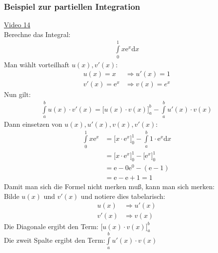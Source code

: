 \subsubsection{Beispiel zur partiellen Integration }
\href{https://youtu.be/92SY1mE5hrMvv}{Video 14}\\
Berechne das Integral:\\
\begin{align*}
\int\limits_{0}^{1} x \mathrm{e}^x\mathrm{d}x
\end{align*}
Man wählt vorteilhaft $ u(x), v'(x) $:\\
\begin{align*}
u(x)=x&\Rightarrow u'(x)=1\\
v'(x)=\mathrm{e}^x&\Rightarrow v(x)=e^x
\end{align*}
Nun gilt:\\
\begin{align*}
\int\limits_{a}^{b}u(x)\cdot v'(x) =\big[u(x)\cdot v(x)\big]^b_a-\int\limits_{a}^{b}u'(x)\cdot v(x) 
\end{align*}
Dann einsetzen von $ u(x), u'(x), v(x), v'(x) $:\\
\begin{align*}
\int\limits_{0}^{1} x\mathrm{e}^x&=\bigg[x\cdot \mathrm{e}^x\bigg]^1_0-\int\limits_{a}^{b} 1\cdot\mathrm{e}^x \mathrm{d}x\\
&=\bigg[x\cdot \mathrm{e}^x\bigg]^1_0-\bigg[\mathrm{e}^x\bigg]_0^1\\
&=\mathrm{e}-0\mathrm{e}^0-(\mathrm{e}-1)\\
&=\mathrm{e}-\mathrm{e}+1=1
\end{align*}
Damit man sich die Formel nicht merken muß, kann man sich merken:\\
Bilde $ u(x) $ und $ v'(x) $ und notiere dies tabelarisch:\\
\begin{align*}
u(x)&\Rightarrow u'(x)\\
v'(x)&\Rightarrow v(x)
\end{align*}
Die Diagonale ergibt den Term: $\big[u(x)\cdot v(x)\big]^b_a  $\\
Die zweit Spalte ergibt den Term:$ \int\limits_{a}^{b}u'(x)\cdot v(x) $
